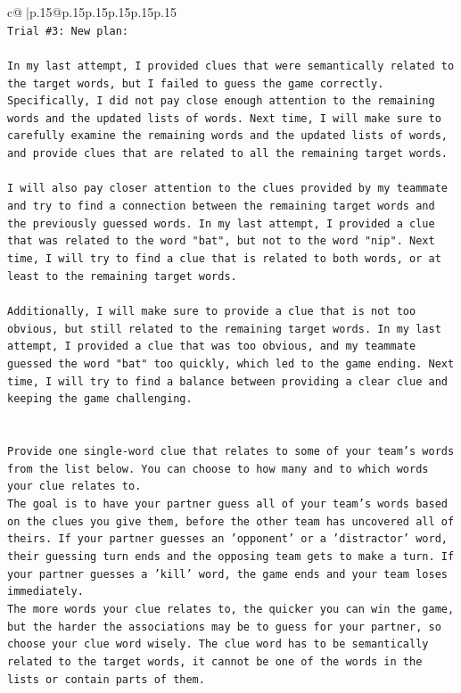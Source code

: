 \documentclass{article}
\begin{document}
{\begin{supertabular}{c@{$\;$}|p{.15\linewidth}@{}p{.15\linewidth}p{.15\linewidth}p{.15\linewidth}p{.15\linewidth}p{.15\linewidth}}
{{{\\ 
\texttt{Trial \#3: New plan: } \\
\\ 
\texttt{In my last attempt, I provided clues that were semantically related to the target words, but I failed to guess the game correctly. Specifically, I did not pay close enough attention to the remaining words and the updated lists of words. Next time, I will make sure to carefully examine the remaining words and the updated lists of words, and provide clues that are related to all the remaining target words.} \\
\\ 
\texttt{I will also pay closer attention to the clues provided by my teammate and try to find a connection between the remaining target words and the previously guessed words. In my last attempt, I provided a clue that was related to the word "bat", but not to the word "nip". Next time, I will try to find a clue that is related to both words, or at least to the remaining target words.} \\
\\ 
\texttt{Additionally, I will make sure to provide a clue that is not too obvious, but still related to the remaining target words. In my last attempt, I provided a clue that was too obvious, and my teammate guessed the word "bat" too quickly, which led to the game ending. Next time, I will try to find a balance between providing a clear clue and keeping the game challenging.} \\
\\ 
\\ 
\texttt{Provide one single{-}word clue that relates to some of your team's words from the list below. You can choose to how many and to which words your clue relates to.} \\
\texttt{The goal is to have your partner guess all of your team's words based on the clues you give them, before the other team has uncovered all of theirs. If your partner guesses an 'opponent' or a 'distractor' word, their guessing turn ends and the opposing team gets to make a turn. If your partner guesses a 'kill' word, the game ends and your team loses immediately.} \\
\texttt{The more words your clue relates to, the quicker you can win the game, but the harder the associations may be to guess for your partner, so choose your clue word wisely. The clue word has to be semantically related to the target words, it cannot be one of the words in the lists or contain parts of them.} \\
}}}
\end{supertabular}}
\end{document}
